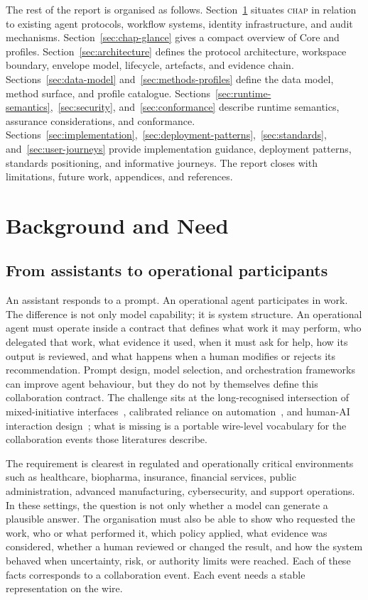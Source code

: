 \documentclass[11pt]{article}
\newcommand{\chap}{\textsc{chap}}
\begin{document}
The rest of the report is organised as follows. Section~\ref{sec:background} situates \chap{} in relation to existing agent protocols, workflow systems, identity infrastructure, and audit mechanisms. Section~\ref{sec:chap-glance} gives a compact overview of Core and profiles. Section~\ref{sec:architecture} defines the protocol architecture, workspace boundary, envelope model, lifecycle, artefacts, and evidence chain. Sections~\ref{sec:data-model} and~\ref{sec:methods-profiles} define the data model, method surface, and profile catalogue. Sections~\ref{sec:runtime-semantics},~\ref{sec:security}, and~\ref{sec:conformance} describe runtime semantics, assurance considerations, and conformance. Sections~\ref{sec:implementation},~\ref{sec:deployment-patterns},~\ref{sec:standards}, and~\ref{sec:user-journeys} provide implementation guidance, deployment patterns, standards positioning, and informative journeys. The report closes with limitations, future work, appendices, and references.

\section{Background and Need}
\label{sec:background}

\subsection{From assistants to operational participants}

An assistant responds to a prompt. An operational agent participates in work. The difference is not only model capability; it is system structure. An operational agent must operate inside a contract that defines what work it may perform, who delegated that work, what evidence it used, when it must ask for help, how its output is reviewed, and what happens when a human modifies or rejects its recommendation. Prompt design, model selection, and orchestration frameworks can improve agent behaviour, but they do not by themselves define this collaboration contract. The challenge sits at the long-recognised intersection of mixed-initiative interfaces~\cite{horvitz1999}, calibrated reliance on automation~\cite{lee2004}, and human-AI interaction design~\cite{amershi2019}; what is missing is a portable wire-level vocabulary for the collaboration events those literatures describe.

The requirement is clearest in regulated and operationally critical environments such as healthcare, biopharma, insurance, financial services, public administration, advanced manufacturing, cybersecurity, and support operations. In these settings, the question is not only whether a model can generate a plausible answer. The organisation must also be able to show who requested the work, who or what performed it, which policy applied, what evidence was considered, whether a human reviewed or changed the result, and how the system behaved when uncertainty, risk, or authority limits were reached. Each of these facts corresponds to a collaboration event. Each event needs a stable representation on the wire.
\end{document}
